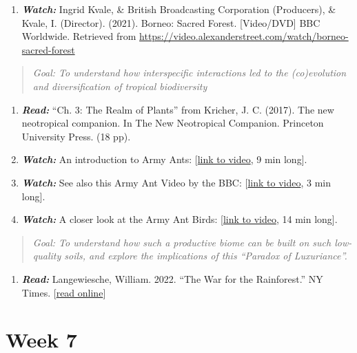 \documentclass[
  10pt,
  letterpaper,
  oneside,
  open=any]{scrbook}
\providecommand{\tightlist}{%
  \setlength{\itemsep}{0pt}\setlength{\parskip}{0pt}}\usepackage{longtable,booktabs,array}
\begin{document}
\begin{enumerate}
\def\labelenumi{\arabic{enumi}.}
\tightlist
\item
  \textbf{\emph{Watch:}} Ingrid Kvale, \& British Broadcasting
  Corporation (Producers), \& Kvale, I. (Director). (2021). Borneo:
  Sacred Forest. {[}Video/DVD{]} BBC Worldwide. Retrieved from
  \url{https://video.alexanderstreet.com/watch/borneo-sacred-forest}
\end{enumerate}

\begin{quote}
\emph{Goal: To understand how interspecific interactions led to the
(co)evolution and diversification of tropical biodiversity}
\end{quote}

\begin{enumerate}
\def\labelenumi{\arabic{enumi}.}
\item
  \textbf{\emph{Read:}} ``Ch. 3: The Realm of Plants'' from Kricher, J.
  C. (2017). The new neotropical companion. In The New Neotropical
  Companion. Princeton University Press. (18 pp).
\item
  \textbf{\emph{Watch:}} An introduction to Army Ants:
  {[}\href{https://www.youtube.com/watch?v=p16g5IVCdeE}{link to video},
  9 min long{]}.
\item
  \textbf{\emph{Watch:}} See also this Army Ant Video by the BBC:
  {[}\href{https://www.youtube.com/watch?v=JsfiUR0ZzLw}{link to video},
  3 min long{]}.
\item
  \textbf{\emph{Watch:}} A closer look at the Army Ant Birds:
  {[}\href{https://www.youtube.com/watch?v=SQPcIYV_vKM}{link to video},
  14 min long{]}.
\end{enumerate}

\begin{quote}
\emph{Goal: To understand how such a productive biome can be built on
such low-quality soils, and explore the implications of this ``Paradox
of Luxuriance''.}
\end{quote}

\begin{enumerate}
\def\labelenumi{\arabic{enumi}.}
\tightlist
\item
  \textbf{\emph{Read:}} Langewiesche, William. 2022. ``The War for the
  Rainforest.'' NY Times.
  {[}\href{https://www.nytimes.com/2022/03/16/magazine/amazon-rainforest-ituna-itata.html}{read
  online}{]}
\end{enumerate}

\section{Week 7}\label{week-7}
\end{document}
